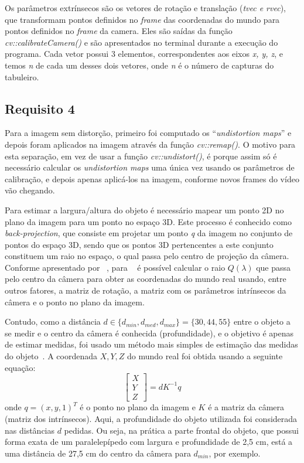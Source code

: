 \documentclass{bmvc2k}
\begin{document}
Os parâmetros extrínsecos são os vetores de rotação e translação (\textit{tvec e rvec}), que transformam pontos definidos no \textit{frame} das coordenadas do mundo para pontos definidos no \textit{frame} da camera. Eles são saídas da função \textit{cv::calibrateCamera()} e são apresentados no terminal durante a execução do programa. Cada vetor possui 3 elementos, correspondentes aos eixos \textit{x, y, z}, e temos \textit{n} de cada um desses dois vetores, onde \textit{n} é o número de capturas do tabuleiro.

\subsection{Requisito 4}
\label{Met:Req4}
Para a imagem sem distorção, primeiro foi computado os ``\textit{undistortion maps}'' e depois foram aplicados na imagem através da função \textit{cv::remap()}. O motivo para esta separação, em vez de usar a função \textit{cv::undistort()}, é porque assim só é necessário calcular os \textit{undistortion maps} uma única vez usando os parâmetros de calibração, e depois apenas aplicá-los na imagem, conforme novos frames do vídeo vão chegando. 

Para estimar a largura/altura do objeto é necessário mapear um ponto 2D no plano da imagem para um ponto no espaço 3D. Este processo é conhecido como \textit{back-projection}, que consiste em projetar um ponto \textit{q} da imagem no conjunto de pontos do espaço 3D, sendo que os pontos 3D pertencentes a este conjunto constituem um raio no espaço, o qual passa pelo centro de projeção da câmera. Conforme apresentado por ~\cite{relatoriomoodle}, para ~\cite{phdcoord} é possível calcular o raio $Q(\lambda)$ que passa pelo centro da câmera para obter as coordenadas do mundo real usando, entre outros fatores, a matriz de rotação, a matriz com os parâmetros intrínsecos da câmera e o ponto no plano da imagem.

Contudo, como a distância $d \in \{d_{min}, d_{med}, d_{max}\} = \{30, 44, 55\}$ entre o objeto a se medir e o centro da câmera é conhecida (profundidade), e o objetivo é apenas de estimar medidas, foi usado um método mais simples de estimação das medidas do objeto~\cite{webpage}. A coordenada $X, Y, Z$ do mundo real foi obtida usando a seguinte equação: \begin{equation}
\begin{bmatrix}
X \\
Y \\
Z 
\end{bmatrix} = dK^{-1}q 
\end{equation} onde $q = (x, y, 1)^{T}$ é o ponto no plano da imagem e $K$ é a matriz da câmera (matriz dos intrínsecos). Aqui, a profundidade do objeto utilizada foi considerada nas distâncias $d$ pedidas. Ou seja, na prática a parte frontal do objeto, que possui forma exata de um paralelepípedo com largura e profundidade de 2,5 cm, está a uma distância de 27,5 cm do centro da câmera para $d_{min}$, por exemplo. 
\end{document}
